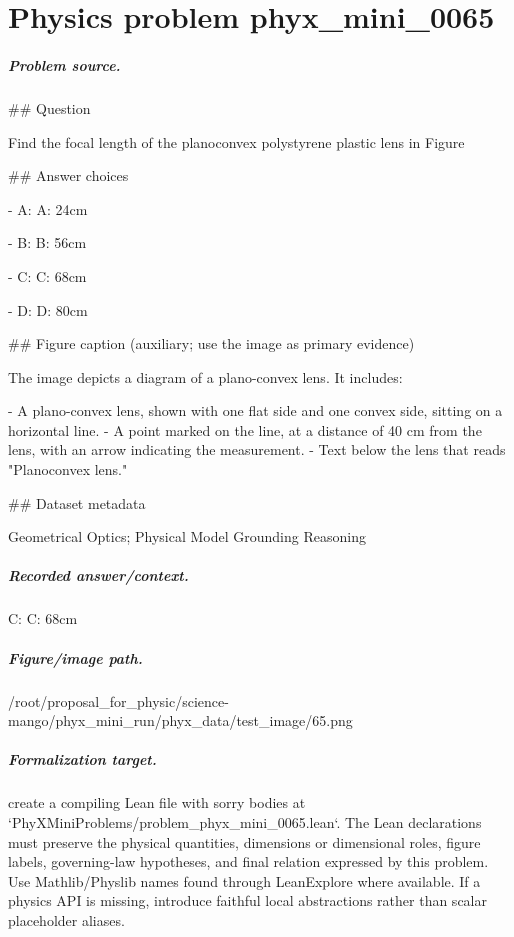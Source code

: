 
\chapter{Physics problem phyx\_mini\_0065}
\label{ch:PhyXMiniProblems_problem_phyx_mini_0065}

\paragraph{Problem source.}
\#\# Question

Find the focal length of the planoconvex polystyrene plastic lens in Figure

\#\# Answer choices

- A: A: 24cm

- B: B: 56cm

- C: C: 68cm

- D: D: 80cm

\#\# Figure caption (auxiliary; use the image as primary evidence)

The image depicts a diagram of a plano-convex lens. It includes:

- A plano-convex lens, shown with one flat side and one convex side, sitting on a horizontal line.
- A point marked on the line, at a distance of 40 cm from the lens, with an arrow indicating the measurement.
- Text below the lens that reads "Planoconvex lens."

\#\# Dataset metadata

Geometrical Optics; Physical Model Grounding Reasoning

\paragraph{Recorded answer/context.}
C: C: 68cm

\paragraph{Figure/image path.}
/root/proposal\_for\_physic/science-mango/phyx\_mini\_run/phyx\_data/test\_image/65.png

\paragraph{Formalization target.}
create a compiling Lean file with sorry bodies at `PhyXMiniProblems/problem\_phyx\_mini\_0065.lean`. The Lean declarations must preserve the physical quantities, dimensions or dimensional roles, figure labels, governing-law hypotheses, and final relation expressed by this problem.
Use Mathlib/Physlib names found through LeanExplore where available. If a physics API is missing, introduce faithful local abstractions rather than scalar placeholder aliases.


